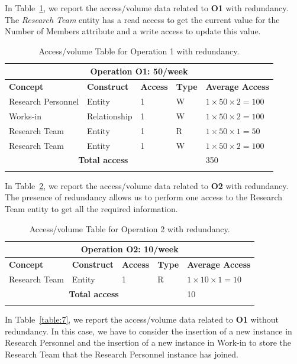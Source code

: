 In Table~\ref{table:5}, we report the access/volume data related to \textbf{O1} with redundancy. The \textit{Research Team} entity has a read access to get the current value for the Number of Members attribute and a write access to update this value.

\begin{longtable}{|p{}|p{}|p{}|p{}|p{}|}
\hline
\multicolumn{5}{|c|}{\textbf{Operation O1: 50/week}}\\\hline
\textbf{Concept} & \textbf{Construct} & \textbf{Access} & \textbf{Type} & \textbf{Average Access} \\
\hline
Research Personnel & Entity & 1 & W & $1 \times 50 \times 2 = 100$\\
Works-in & Relationship & 1 & W & $1 \times 50 \times 2 = 100$\\
Research Team & Entity & 1 & R & $1 \times 50 \times 1 = 50$\\
Research Team & Entity & 1 & W & $1 \times 50 \times 2 = 100$\\
\hline
\multicolumn{4}{|c|}{\textbf{Total access}} & 350\\
\hline
\caption{Access/volume Table for Operation 1 with redundancy.}
\label{table:5}
\end{longtable}

In Table~\ref{table:6}, we report the access/volume data related to \textbf{O2} with redundancy. The presence of redundancy
allows us to perform one access to the Research Team entity to get all the required information.

\begin{longtable}{|p{}|p{}|p{}|p{}|p{}|}
\hline
\multicolumn{5}{|c|}{\textbf{Operation O2: 10/week}}\\\hline
\textbf{Concept} & \textbf{Construct} & \textbf{Access} & \textbf{Type} & \textbf{Average Access} \\
\hline
Research Team & Entity & 1 & R & $1 \times 10 \times 1 = 10$\\
\hline
\multicolumn{4}{|c|}{\textbf{Total access}} & 10\\
\hline
\caption{Access/volume Table for Operation 2 with redundancy.}
\label{table:6}
\end{longtable}

In Table~\ref{table:7}, we report the access/volume data related to \textbf{O1} without redundancy. In this case, we have to
consider the insertion of a new instance in Research Personnel and the insertion of a new instance in Work-in to store the Research Team that the Research Personnel instance has joined.

